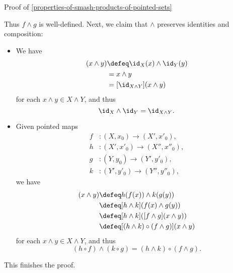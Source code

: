 \begin{Proof}{Proof of \cref{properties-of-smash-products-of-pointed-sets}}
\begin{enumerate}
    \end{enumerate}
    Thus $f\wedge g$ is well-defined. Next, we claim that $\wedge$ preserves identities and composition:
    \begin{itemize}
        \item{}We have
            \begin{align*}
                [\id_{X}\wedge\id_{Y}](x\wedge y) &\defeq \id_{X}(x)\wedge\id_{Y}(y)\\
                                                  &=      x\wedge y\\
                                                  &=      [\id_{X\wedge Y}](x\wedge y)
            \end{align*}
            for each $x\wedge y\in X\wedge Y$, and thus
            \[
                \id_{X}\wedge\id_{Y}%
                =%
                \id_{X\wedge Y}.%
            \]%
        \item{}Given pointed maps
            \begin{align*}
                f &\colon (X,x_{0})   \to (X',x'_{0}),\\
                h &\colon (X',x'_{0}) \to (X'',x''_{0}),\\
                g &\colon (Y,y_{0}) \to (Y',y'_{0}),\\
                k &\colon (Y',y'_{0}) \to (Y'',y''_{0}),
            \end{align*}
            we have
            \begin{align*}
                [(h\circ f)\wedge(k\circ g)](x\wedge y) &\defeq h(f(x))\wedge k(g(y))\\
                                                        &\defeq [h\wedge k](f(x)\wedge g(y))\\
                                                        &\defeq [h\wedge k]([f\wedge g](x\wedge y))\\
                                                        &\defeq [(h\wedge k)\circ(f\wedge g)](x\wedge y)
            \end{align*}
            for each $x\wedge y\in X\wedge Y$, and thus
            \[
                (h\circ f)\wedge(k\circ g)%
                =%
                (h\wedge k)\circ(f\wedge g).%
            \]%
    \end{itemize}
    This finishes the proof.


\end{Proof}
